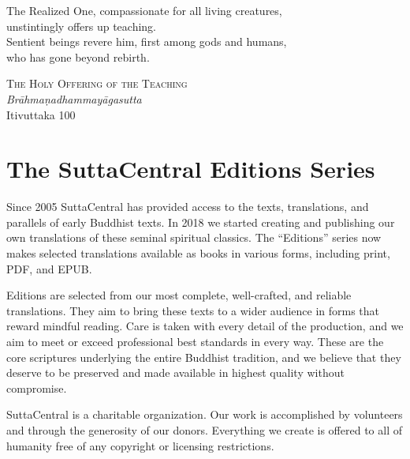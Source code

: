 \documentclass[12pt,openany]{book}%
\newcommand{\blankpage}{
\newpage
\thispagestyle{empty}
\mbox{}
\newpage
}
\newcommand*{\epigraphTranslatedTitle}[1]{\vspace*{.5em}\footnotesize\textsc{#1}\\}%
\newcommand*{\epigraphRootTitle}[1]{\footnotesize\textit{#1}\\}%
\newcommand*{\epigraphReference}[1]{\footnotesize{#1}}%
\begin{document}
\newpage

\setlength{\parindent}{1.5em}%
\newpage

\vspace*{\fill}

\begin{center}
\epigraph{The Realized One, compassionate for all living creatures,\\
unstintingly offers up teaching.\\
Sentient beings revere him, first among gods and humans,\\
who has gone beyond rebirth.}
{
\epigraphTranslatedTitle{The Holy Offering of the Teaching}
\epigraphRootTitle{\textsanskrit{Brāhmaṇadhammayāgasutta}}
\epigraphReference{Itivuttaka 100}
}
\end{center}

\vspace*{2in}

\vspace*{\fill}

\blankpage%

\setlength{\parindent}{1em}
%
\tableofcontents
\newpage
\pagestyle{fancy}
%
\chapter*{The SuttaCentral Editions Series}

Since 2005 SuttaCentral has provided access to the texts, translations, and parallels of early Buddhist texts. In 2018 we started creating and publishing our own translations of these seminal spiritual classics. The “Editions” series now makes selected translations available as books in various forms, including print, PDF, and EPUB.

Editions are selected from our most complete, well-crafted, and reliable translations. They aim to bring these texts to a wider audience in forms that reward mindful reading. Care is taken with every detail of the production, and we aim to meet or exceed professional best standards in every way. These are the core scriptures underlying the entire Buddhist tradition, and we believe that they deserve to be preserved and made available in highest quality without compromise.

SuttaCentral is a charitable organization. Our work is accomplished by volunteers and through the generosity of our donors. Everything we create is offered to all of humanity free of any copyright or licensing restrictions. 
\end{document}

